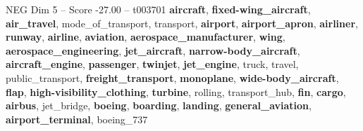 \begin{textsample}{NEG Dim 5 – Score -27.00 – t003701}  \label{ex:f5_neg_001}
\textbf{aircraft}, \textbf{fixed-wing\_aircraft}, \textbf{air\_travel}, mode\_of\_transport, transport, \textbf{airport}, \textbf{airport\_apron}, \textbf{airliner}, \textbf{runway}, \textbf{airline}, \textbf{aviation}, \textbf{aerospace\_manufacturer}, \textbf{wing}, \textbf{aerospace\_engineering}, \textbf{jet\_aircraft}, \textbf{narrow-body\_aircraft}, \textbf{aircraft\_engine}, \textbf{passenger}, \textbf{twinjet}, \textbf{jet\_engine}, truck, travel, public\_transport, \textbf{freight\_transport}, \textbf{monoplane}, \textbf{wide-body\_aircraft}, \textbf{flap}, \textbf{high-visibility\_clothing}, \textbf{turbine}, rolling, transport\_hub, \textbf{fin}, \textbf{cargo}, \textbf{airbus}, jet\_bridge, \textbf{boeing}, \textbf{boarding}, \textbf{landing}, \textbf{general\_aviation}, \textbf{airport\_terminal}, boeing\_737

\end{textsample}
